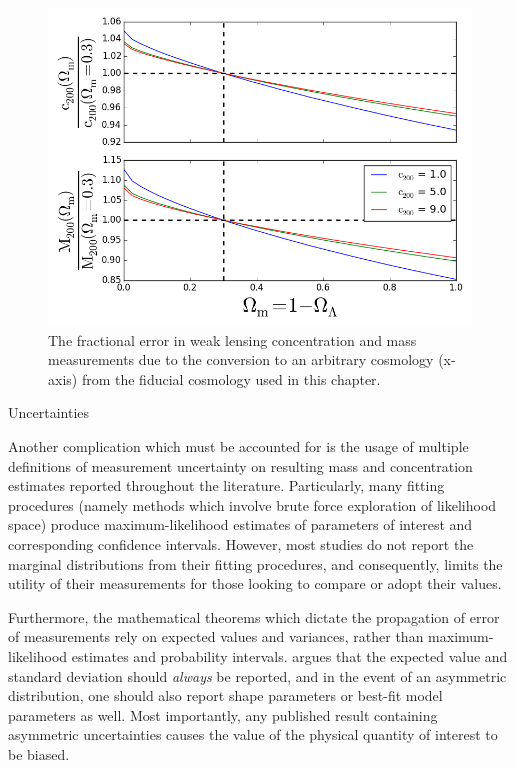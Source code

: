 \begin{figure}
\begin{center}
\includegraphics[width=\linewidth]{./images/CMRelationProject/CosmoCorrection.png}
\end{center}
\caption[Concentration/Mass Cosmology Correction]{The fractional error in weak lensing concentration and mass
  measurements due to the conversion to an arbitrary cosmology (x-axis) from the
  fiducial cosmology used in this chapter.}
\end{figure}


\centerline{{\large Uncertainties}}
Another complication which must be accounted for is the usage of
multiple definitions of measurement uncertainty on resulting mass
and concentration estimates reported throughout the literature. Particularly,
many fitting procedures (namely methods which involve brute force exploration
of likelihood space) produce maximum-likelihood estimates of
parameters of interest and corresponding confidence intervals. However, most
studies do not report the marginal distributions from their fitting procedures,
and consequently, limits the utility of their measurements for those looking to
compare or adopt their values.

Furthermore, the mathematical theorems which dictate the propagation
of error of measurements rely on expected values and variances, rather
than maximum-likelihood estimates and probability
intervals. \citet{DA04.1} argues that the expected value and standard
deviation should {\em always} be reported, and in the event of an
asymmetric distribution, one should also report shape parameters or
best-fit model parameters as well. Most importantly, any published
result containing asymmetric uncertainties causes the value of the
physical quantity of interest to be biased.

